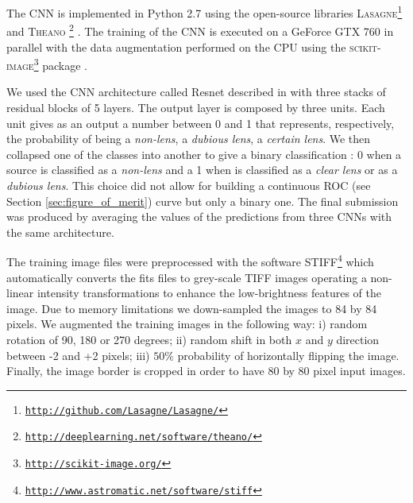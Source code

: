 \documentclass{aa}
\begin{document}

The CNN is implemented in Python 2.7 using the open-source libraries \textsc{Lasagne}\footnote{\href{http://github.com/Lasagne/Lasagne/}{\tt http://github.com/Lasagne/Lasagne/}} 
and \textsc{Theano}
\footnote{\href{http://deeplearning.net/software/theano/}{\tt http://deeplearning.net/software/theano/}} \citep{theano}.  
The training of the CNN is executed on a GeForce GTX 760 in parallel with the data augmentation performed on the CPU using the \textsc{scikit-image}\footnote{\href{http://scikit-image.org/}{\tt http://scikit-image.org/}} package \citep{van2014scikit}. 

We used the CNN architecture called Resnet described in \citep{he2015deep} with three stacks of residual blocks of 5 layers. 
The output layer is composed by three units. Each unit gives as an output a number between 0 and 1 that represents, respectively, the probability of being a \textit{non-lens}, a \textit{dubious lens}, a \textit{certain lens}.  We then collapsed one of the classes into another to give a binary classification : 0 when a source is classified as a \textit{non-lens} and a 1 when is classified as a \textit{clear lens} or as a \textit{dubious lens}. This choice did not allow for building  a continuous ROC (see Section \ref{sec:figure_of_merit})  curve but only a binary one.
The final submission was produced by averaging the values of the predictions from three CNNs with the same architecture.


The training image files were preprocessed with the software \textsc{STIFF}\footnote{\href{http://www.astromatic.net/software/stiff}{\tt http://www.astromatic.net/software/stiff}} which automatically converts the fits files to grey-scale TIFF images operating a non-linear intensity transformations to enhance the low-brightness features of the image.   
Due to memory limitations we down-sampled the images to 84 by 84 pixels. 
We augmented the training images in the following way: i) random rotation of 90, 180 or 270 degrees; ii) random shift in both $x$ and $y$ direction between -2 and +2 pixels; iii) $50\%$ probability of horizontally flipping the image. 
Finally, the image border is cropped in order to have 80 by 80 pixel input images.
\end{document}
